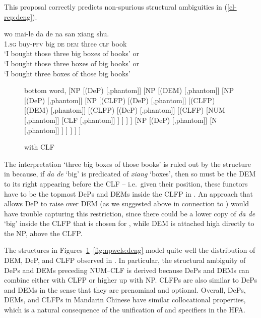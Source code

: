 \documentclass[output=paper,colorlinks,citecolor=brown]{langscibook}
\begin{document}
This proposal correctly predicts non-spurious structural ambiguities in (\ref{cl-rep:deng}). 

\ea
{\gll wo mai-le da de na san xiang shu.\\
1.\textsc{sg} buy-\textsc{pfv} big \textsc{de} \textsc{dem} three \textsc{clf} book\\
\glt `I bought those three big boxes of books' or \\`I bought those three boxes of big books'  or \\`I bought three boxes of those big books' \label{cl-rep:deng}
}
\z


  \begin{figure}[b]
    \centering
		\begin{forest}
		bottom word,
		[NP
			[(DeP) [,phantom]]
			[NP
			[(DEM) [,phantom]]
			[NP
			[(DeP) [,phantom]]
			[NP
			[({CLFP})
			[({DeP}) [,phantom]]
			[({CLFP})
			[({DEM}) [,phantom]]
			[({CLFP})
			[({DeP}) [,phantom]]
			[({CLFP})
			[NUM [,phantom]]
			[{CLF} [,phantom]]
			]
			]
			]
			]
			[NP
			[(DeP) [,phantom]]
			[N [,phantom]]
			]
			]
			]
			]
		]
		\end{forest}
    \caption{ with CLF}
    \label{fig:npwclm:deng}
  \end{figure}


\noindent The interpretation `three big boxes of those books' is ruled out by the structure in   because, if \textit{da de} `big'  is predicated of \textit{xiang} `boxes', then so must be the DEM to its right appearing before the CLF -- i.e.\ given their position, these functors have to be the topmost DePs and DEMs inside the CLFP in . An approach that allows DeP to raise over DEM (as we suggested above in connection to \citealt{Cinque05b}) would have trouble capturing this restriction, since there could be a lower copy of \textit{da de} `big'  inside the CLFP that is chosen for , while DEM is attached high directly to the NP, above the CLFP. %





The structures in Figures~\ref{fig:npwclm:deng}--\ref{fig:npwcls:deng} model quite well the distribution of DEM, DeP, and CLFP observed in . In particular, the structural ambiguity of DePs and DEMs preceding NUM--CLF is derived because DePs and DEMs can combine either with  CLFP or higher up with NP. CLFPs are also similar to DePs and DEMs in the sense that they are prenominal and optional. Overall, DePs, DEMs, and CLFPs in Mandarin Chinese have similar collocational properties, which is a natural consequence of the unification of  and specifiers in the HFA.
\end{document}

